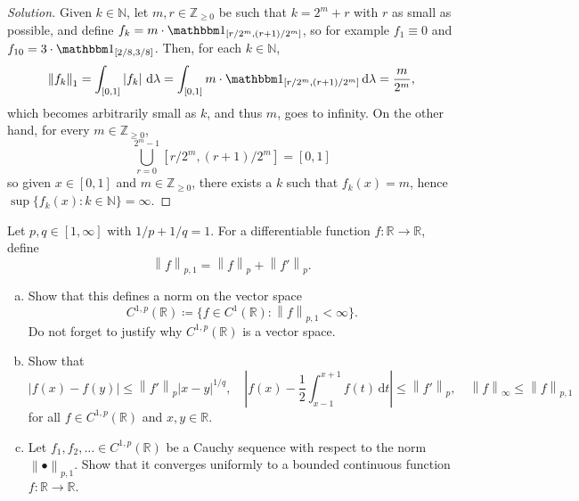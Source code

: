 \documentclass[10pt]{article}
\newcommand{\dd}{\,\mathrm{d}}
\providecommand{\half}{\frac{1}{2}}
\providecommand{\NN}{\mathbb N}
\providecommand{\RR}{\mathbb R}
\providecommand{\ZZ}{\mathbb Z}
\providecommand{\ind}{\mathbbm 1}
\providecommand{\ii}{\item}
\newenvironment{soln}{\begin{proof}[Solution]}{\end{proof}}
\providecommand{\abs}[1]{\left\lvert #1\right\rvert}
\providecommand{\norm}[1]{\left\| #1\right\|}
\begin{document}
\begin{soln}
    Given $k\in\NN$, let $m,r\in\ZZ_{\ge0}$ be such that
    $k = 2^m + r$ with $r$ as small as possible, and define
    $f_k = m\cdot \ind_{[r/2^m, (r+1)/2^m]}$,
    so for example $f_1 \equiv 0$ and $f_{10} = 3\cdot\ind_{[2/8, 3/8]}$.
    Then, for each $k\in\NN$,
    \begin{equation*}
	\norm{f_k}_1 = \int_{[0,1]}\abs{f_k}\dd\lambda
	= \int_{[0,1]} m\cdot \ind_{[r/2^m, (r+1)/2^m]}\dd\lambda
	= \frac{m}{2^m},
    \end{equation*}
    which becomes arbitrarily small as $k$, and thus $m$, goes to infinity.
    On the other hand, for every $m\in\ZZ_{\ge0}$,
    \[
	\bigcup_{r=0}^{2^m-1} [r/2^m, (r+1)/2^m] = [0,1]
    \]
    so given $x\in[0,1]$ and $m\in\ZZ_{\ge0}$, there exists a $k$
    such that $f_k(x) = m$, hence $\sup\{f_k(x) : k\in\NN\} = \infty$.
\end{soln}


\pagebreak

\begin{problem}
    Let $p,q\in[1,\infty]$ with $1/p + 1/q = 1$.
    For a differentiable function $f\colon\RR\to\RR$, define
    \begin{equation*}
	\norm{f}_{p,1} = \norm{f}_p + \norm{f'}_p.
    \end{equation*}
    \begin{enumerate}[(a)]
        \ii Show that this defines a norm on the vector space
	\begin{equation*}
	    C^{1,p}(\RR)\coloneq\{f\in C^1(\RR) : \norm{f}_{p,1}<\infty\}.
	\end{equation*}
	Do not forget to justify why $C^{1,p}(\RR)$ is a vector space.
	\ii Show that
	\begin{equation*}
	    \abs{f(x) - f(y)} \le \norm{f'}_p\abs{x-y}^{1/q},\quad
	    \abs{f(x) - \half\int_{x-1}^{x+1}f(t)\dd t} \le \norm{f'}_p,\quad
	    \norm{f}_\infty\le \norm f_{p,1}
	\end{equation*}
	for all $f\in C^{1,p}(\RR)$ and $x,y\in\RR$.
	\ii Let $f_1,f_2,\ldots\in C^{1,p}(\RR)$ be a Cauchy sequence
	with respect to the norm $\norm{\bullet}_{p,1}$.
	Show that it converges uniformly to
	a bounded continuous function $f\colon\RR\to\RR$.
    \end{enumerate}
\end{problem}
\end{document}
